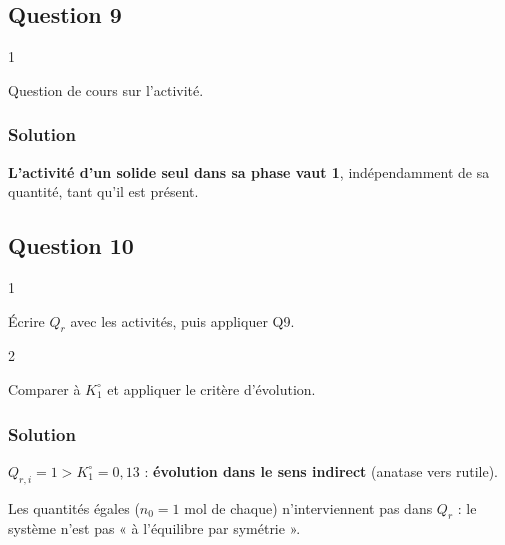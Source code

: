 \documentclass[11pt,a4paper]{article}
\newcommand{\equationajustee}[1]{%
  \sbox{\boiteequation}{$\displaystyle #1$}%
  \ifdim\wd\boiteequation>\linewidth
    \[\resizebox{\linewidth}{!}{\usebox{\boiteequation}}\]%
  \else
    \[#1\]%
  \fi}
\begin{document}
\hypertarget{question-9}{%
\subsection{Question 9}\label{question-9}}

\begin{indication}{1}

Question de cours sur l'activité.

\end{indication}

\hypertarget{solution-8}{%
\subsubsection{Solution}\label{solution-8}}

\textbf{L'activité d'un solide seul dans sa phase vaut 1}, indépendamment de sa quantité, tant qu'il est présent.

\hypertarget{question-10}{%
\subsection{Question 10}\label{question-10}}

\begin{indication}{1}

Écrire \(Q_r\) avec les activités, puis appliquer Q9.

\end{indication}

\begin{indication}{2}

Comparer à \(K^\circ_1\) et appliquer le critère d'évolution.

\end{indication}

\hypertarget{solution-9}{%
\subsubsection{Solution}\label{solution-9}}

\equationajustee{\begin{aligned}
Q_{r,i} &= \frac{a(\mathrm A)}{a(\mathrm R)} \\
&= \frac{1}{1} = 1
\end{aligned}}

\(Q_{r,i} = 1 > K^\circ_1 = 0{,}13\) : \textbf{évolution dans le sens indirect} (anatase vers rutile).

\begin{piege}

Les quantités égales (\(n_0 = 1\) mol de chaque) n'interviennent pas dans \(Q_r\) : le système n'est pas « à l'équilibre par symétrie ».

\end{piege}
\end{document}
